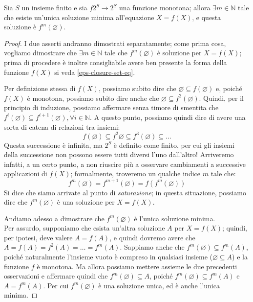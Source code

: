 \documentclass[class=book, crop=false, oneside, 12pt]{standalone}
\begin{document}
\begin{theorem}
    Sia \(S\) un insieme finito e sia \(f 2^S \to 2^S\) una funzione monotona; allora \(\exists m \in \mathbb{N}\) tale che esiste un'unica soluzione minima all'equazione \(X = f(X)\), e questa soluzione è \(f^m(\varnothing)\).
\end{theorem}

\begin{proof}
    I due asserti andranno dimostrati separatamente; come prima cosa, vogliamo dimostrare che \(\exists m \in \mathbb{N}\) tale che \(f^m(\varnothing)\) è soluzione per \(X = f(X)\); prima di procedere è inoltre consigliabile avere ben presente la forma della funzione \(f(X)\) si veda \ref{eps-closure-set-eq}.

    Per definizione stessa di \(f(X)\), possiamo subito dire che \(\varnothing \subseteq f(\varnothing)\) e, poiché \(f(X)\) è monotona, possiamo subito dire anche che \(\varnothing \subseteq f^2(\varnothing)\). Quindi, per il principio di induzione, possiamo affermare senza timore di smentita che \(f^i(\varnothing) \subseteq f^{i + 1}(\varnothing), \forall i \in \mathbb{N} \). A questo punto, possiamo quindi dire di avere una sorta di catena di relazioni tra insiemi:
    \begin{equation*}
        f(\varnothing) \subseteq f^2{\varnothing} \subseteq f^3(\varnothing) \subseteq \ldots
    \end{equation*}
    Questa successione è infinita, ma \(2^S\) è definito come finito, per cui gli insiemi della successione non possono essere tutti diversi l'uno dall'altro! Arriveremo infatti, a un certo punto, a non riuscire più a osservare cambiamenti a successive applicazioni di \(f(X)\); formalmente, troveremo un qualche indice \(m\) tale che:
    \begin{equation*}
        f^m(\varnothing) = f^{m + 1} (\varnothing) = f(f^m(\varnothing))
    \end{equation*}
    Si dice che siamo arrivate al punto di \emph{saturazione}; in questa situazione, possiamo dire che \(f^m(\varnothing)\) è una soluzione per \(X = f(X)\).

    Andiamo adesso a dimostrare che \(f^m(\varnothing)\) è l'unica soluzione minima.\\
    Per assurdo, supponiamo che esista un'altra soluzione \(A\) per \(X = f(X)\); quindi, per ipotesi, deve valere \(A = f(A)\), e quindi dovremo avere che \(A = f(A) = f^2(A) = \ldots = f^m(A)\). Sappiamo anche che \(f^m(\varnothing) \subseteq f^m(A)\), poiché naturalmente l'insieme vuoto è compreso in qualsiasi insieme (\(\varnothing \subseteq A\)) e la funzione \(f\) è monotona. Ma allora possiamo mettere assieme le due precedenti osservazioni e affermare quindi che \(f^m(\varnothing) \subseteq A\), poiché \(f^m(\varnothing) \subseteq f^m(A)\) e \(A = f^m(A)\). Per cui \(f^m(\varnothing)\) è una soluzione unica, ed è anche l'unica minima. 

\end{proof}
\end{document}
